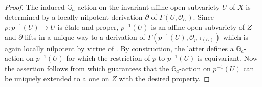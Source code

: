 \documentclass[10pt,oneside,english]{amsart}
\numberwithin{equation}{section}
\numberwithin{figure}{section}
\theoremstyle{plain}
\theoremstyle{remark}
\theoremstyle{plain}
\theoremstyle{plain}
\theoremstyle{definition}
\begin{document}
\begin{proof}
The induced $\mathbb{G}_{a}$-action on the invariant affine open
subvariety $U$ of $X$ is determined by a locally nilpotent derivation
$\partial$ of $\Gamma(U,\mathcal{O}_{U})$. Since $p:p^{-1}\left(U\right)\rightarrow U$
is \'etale and proper, $p^{-1}\left(U\right)$ is an affine open
subvariety of $Z$ and $\partial$ lifts in a unique way to a derivation
of $\Gamma(p^{-1}(U),\mathcal{O}_{p^{-1}\left(U\right)})$ which is
again locally nilpotent by virtue of \cite{Vasconcelos1969}. By construction,
the latter defines a $\mathbb{G}_{a}$-action on $p^{-1}\left(U\right)$
for which the restriction of $p$ to $p^{-1}\left(U\right)$ is equivariant.
Now the assertion follows from  \cite[Lemma 6.1]{Seshadri1972} which
guarantees that the $\mathbb{G}_{a}$-action on $p^{-1}\left(U\right)$
can be uniquely extended to a one on $Z$ with the desired property. 
\end{proof}
\end{document}
